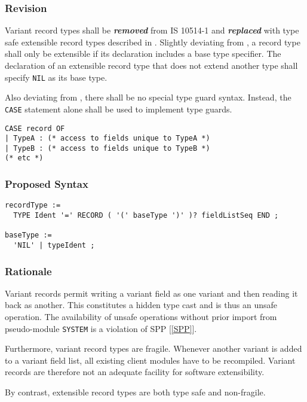 \documentclass[10pt,a4paper,leqno,fleqn]{article}
\renewcommand{\emph}[1]{\textbf{\textit{#1}}}
\begin{document}
\subsubsection{Revision}

Variant record types shall be \emph{removed} from IS 10514-1 and
\emph{replaced} with type safe extensible record types described in \cite{Wirth90}.
Slightly deviating from \cite{Wirth90}, a record type shall only be extensible if its
declaration includes a base type specifier. The declaration of an extensible record
type that does not extend another type shall specify \verb|NIL| as its base type.

Also deviating from \cite{Wirth90}, there shall be no special type guard syntax.
Instead, the \verb|CASE| statement alone shall be used to implement type guards.

\lstset{style=modula2}
\begin{lstlisting}
CASE record OF
| TypeA : (* access to fields unique to TypeA *)
| TypeB : (* access to fields unique to TypeB *)
(* etc *)
\end{lstlisting}

\subsubsection{Proposed Syntax}

\begin{verbatim}
recordType :=
  TYPE Ident '=' RECORD ( '(' baseType ')' )? fieldListSeq END ;
  
baseType :=
  'NIL' | typeIdent ;
\end{verbatim}

\subsubsection{Rationale}

Variant records permit writing a variant field as one variant and then reading
it back as another. This constitutes a hidden type cast and is thus an unsafe
operation. The availability of unsafe operations without prior import from
pseudo-module \verb|SYSTEM| is a violation of SPP [\ref{SPP}].

Furthermore, variant record types are fragile. Whenever another variant is
added to a variant field list, all existing client modules have to be recompiled.
Variant records are therefore not an adequate facility for software extensibility.

By contrast, extensible record types are both type safe and non-fragile.
\end{document}
